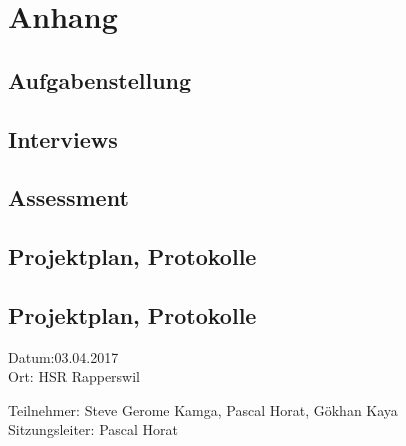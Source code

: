 \chapter*{Anhang}
\label{sec:Anhang}

\section*{Aufgabenstellung}

\section*{Interviews}

\section*{Assessment}

\section*{Projektplan, Protokolle}







\section*{Projektplan, Protokolle}

Datum:03.04.2017\\
Ort: HSR Rapperswil

Teilnehmer: Steve Gerome Kamga, Pascal Horat, Gökhan Kaya\\
Sitzungsleiter: Pascal Horat

